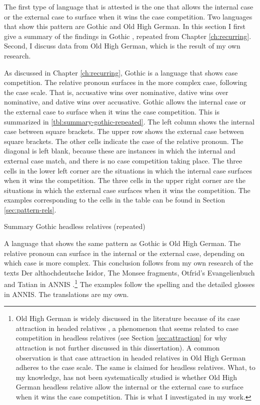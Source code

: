 The first type of language that is attested is the one that allows the internal case or the external case to surface when it wins the case competition. Two languages that show this pattern are Gothic and Old High German. In this section I first give a summary of the findings in Gothic \citep{harbert1978}, repeated from Chapter \ref{ch:recurring}. Second, I discuss data from Old High German, which is the result of my own research.

As discussed in Chapter \ref{ch:recurring}, Gothic is a language that shows case competition. The relative pronoun surfaces in the more complex case, following the case scale. That is, accusative wins over nominative, dative wins over nominative, and dative wins over accusative.
Gothic allows the internal case or the external case to surface when it wins the case competition. This is summarized in \ref{tbl:summary-gothic-repeated}. The left column shows the internal case between square brackets. The upper row shows the external case between square brackets. The other cells indicate the case of the relative pronoun. The diagonal is left blank, because these are instances in which the internal and external case match, and there is no case competition taking place.
The three cells in the lower left corner are the situations in which the internal case surfaces when it wins the competition. The three cells in the upper right corner are the situations in which the external case surfaces when it wins the competition.
The examples corresponding to the cells in the table can be found in Section \ref{sec:pattern-rels}.

\begin{table}[H]
  \center
  \caption{Summary Gothic headless relatives (repeated)}
    
    \label{tbl:summary-gothic-repeated}
\end{table}

A language that shows the same pattern as Gothic is Old High German. The relative pronoun can surface in the internal or the external case, depending on which case is more complex. This conclusion follows from my own research of the texts Der althochdeutsche Isidor, The Monsee fragments, Otfrid's Evangelienbuch and Tatian in ANNIS \citep{krause2016}.\footnote{
Old High German is widely discussed in the literature because of its case attraction in headed relatives \citep[cf.][]{pittner1995}, a phenomenon that seems related to case competition in headless relatives (see Section \ref{sec:attraction} for why attraction is not further discussed in this dissertation).
A common observation is that case attraction in headed relatives in Old High German adheres to the case scale. The same is claimed for headless relatives.
What, to my knowledge, has not been systematically studied is whether Old High German headless relative allow the internal or the external case to surface when it wins the case competition. This is what I investigated in my work.
}
The examples follow the spelling and the detailed glosses in ANNIS. The translations are my own.

